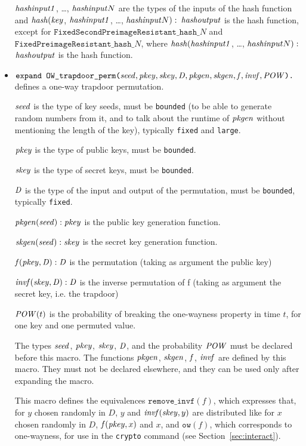 \documentclass{article}
\begin{document}
\begin{itemize}
   $\mathit{hashinput1}$, \dots, $\mathit{hashinput}N$ are the types of the inputs of the hash function and
   $\mathit{hash}(\mathit{key}$, $\mathit{hashinput1}$, \dots, $\mathit{hashinput}N):$ $\mathit{hashoutput}$ is the hash function, except for $\texttt{FixedSecondPreimageResistant\_hash\_}N$ and $\texttt{FixedPreimageResistant\_hash\_}N$, where $\mathit{hash}(\mathit{hashinput1}$, \dots, $\mathit{hashinput}N):$ $\mathit{hashoutput}$ is the hash function.


\item $\texttt{expand OW\_trapdoor\_perm(}\mathit{seed}, \mathit{pkey}, \mathit{skey}, \mathit{D}, \mathit{pkgen}, \mathit{skgen}, \mathit{f}, \mathit{invf}, \mathit{POW}\texttt{).}$ defines a one-way trapdoor permutation.

   $\mathit{seed}$ is the type of key seeds, must be \texttt{bounded} (to be able to generate random numbers from it, and to talk about
  the runtime of $\mathit{pkgen}$ without mentioning the length of the key), typically \texttt{fixed} and \texttt{large}.

   $\mathit{pkey}$ is the type of public keys, must be \texttt{bounded}.

   $\mathit{skey}$ is the type of secret keys, must be \texttt{bounded}.

   $\mathit{D}$ is the type of the input and output of the permutation, must be \texttt{bounded}, typically \texttt{fixed}.

   $\mathit{pkgen}(\mathit{seed}): \mathit{pkey}$ is the public key generation function.

   $\mathit{skgen}(\mathit{seed}): \mathit{skey}$ is the secret key generation function.

   $\mathit{f}(\mathit{pkey}, \mathit{D}):\mathit{D}$ is the permutation (taking as argument the public key)

   $\mathit{invf}(\mathit{skey}, \mathit{D}):\mathit{D}$ is the inverse permutation of f (taking as argument the secret key,
         i.e. the trapdoor)

   $\mathit{POW}(t)$ is the probability of breaking the one-wayness property
   in time $t$, for one key and one permuted value.

   The types $\mathit{seed}$, $\mathit{pkey}$, $\mathit{skey}$, $\mathit{D}$, and the probability $\mathit{POW}$ must be
   declared before this macro. The functions $\mathit{pkgen}$, $\mathit{skgen}$, $\mathit{f}$, $\mathit{invf}$
   are defined by this macro. They must not be declared elsewhere, and
   they can be used only after expanding the macro. 

   This macro defines the equivalences $\texttt{remove\_invf}(f)$,
   which expresses that, for $y$ chosen randomly in $D$, $y$ and
   $\mathit{invf}(\mathit{skey}, y)$ are distributed like for $x$ chosen
   randomly in $D$, $\mathit{f}(\mathit{pkey}, x)$ and $x$, and
   $\texttt{ow}(f)$, which corresponds to one-wayness, for use in the
   \texttt{crypto} command (see Section~\ref{sec:interact}).


\end{itemize}
\end{document}
